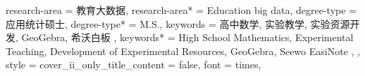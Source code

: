{{      %
    research-area = {教育大数据},
    research-area* = {Education big data},
    degree-type = {应用统计硕士},
    degree-type* = {M.S.},
    keywords = {
      高中数学,
      实验教学,
      实验资源开发,
      GeoGebra,
      希沃白板
    },
    keywords* = {
      High School Mathematics, Experimental Teaching, Development of Experimental Resources, GeoGebra, Seewo EasiNote
    },
  },
  style = {
    cover_ii_only_title_content = false,
    font = times,
}}

